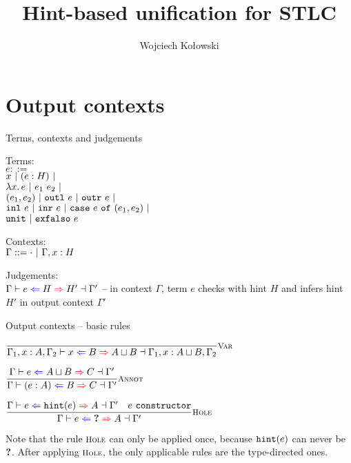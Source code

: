 \documentclass{beamer}
\title{Hint-based unification for STLC}
\author{Wojciech Kołowski}
\date{}
\begin{document}
\frame{\titlepage}

\section{Output contexts}

\begin{frame}{Terms, contexts and judgements}

Terms: \\
$e ::=$ \\
\qquad $x \ |\  (e : H) \ |\  $ \\
\qquad $\lambda x.\, e \ |\  e_1\ e_2 \ |\ $ \\
\qquad $(e_1, e_2) \ |\  \texttt{outl}\ e \ |\  \texttt{outr}\ e \ |\ $ \\
\qquad $\texttt{inl}\ e \ |\  \texttt{inr}\ e \ |\  \texttt{case}\ e\ \texttt{of}\ (e_1, e_2) \ |\ $ \\
\qquad $\texttt{unit} \ |\  \texttt{exfalso}\ e$

\vspace{1em}

Contexts: \\
$\Gamma ::= \cdot \ |\  \Gamma, x : H$

\vspace{2em}

Judgements: \\
$\fulloutctx{\Gamma}{e}{H}{H'}{\Gamma'}$ -- in context $\Gamma$, term $e$ checks with hint $H$ and infers hint $H'$ in output context $\Gamma'$

\end{frame}

\begin{frame}{Output contexts -- basic rules}

\begin{center}
  $\infrule[Var]{}{\fulloutctx{\Gamma_1, x : A, \Gamma_2}{x}{B}{\combinehints{A}{B}}{\Gamma_1, x : \combinehints{A}{B}, \Gamma_2}}$

  \vspace{2em}

  $\infrule[Annot]{\outctx{e}{\combinehints{A}{B}}{C}}{\outctx{\annot{e}{A}}{B}{C}}$

  \vspace{2em}

  $\infrule[Hole]{\outctx{e}{\hintfor{e}}{A} \quad \sidecond{e\ \texttt{constructor}}}{\outctx{e}{\Hole}{A}}$
\end{center}

\vspace{2em}

Note that the rule $\textsc{\footnotesize{Hole}}$ can only be applied once, because $\texttt{hint}(e)$ can never be $\textbf{?}$. After applying $\textsc{\footnotesize{Hole}}$, the only applicable rules are the type-directed ones.

\end{frame}
\end{document}
